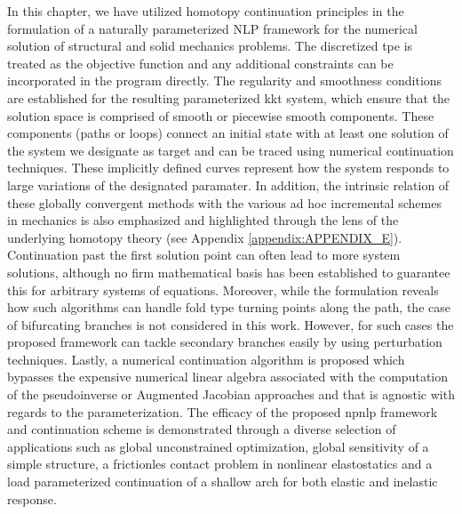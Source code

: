 In this chapter, we have utilized homotopy continuation principles in the
formulation of a naturally parameterized NLP framework for
the numerical solution of structural and solid mechanics problems. The
discretized \acrshort{tpe} is treated as the objective function and any 
additional
constraints can be incorporated in the program directly. The regularity and
smoothness conditions are established for the resulting parameterized 
\acrshort{kkt}
system, which ensure that the
solution space is comprised of smooth or piecewise smooth components. These
components (paths or loops) connect an initial state with at least one solution 
of the system we designate as target and can be traced using numerical
continuation techniques. These implicitly defined curves
represent how the system responds to large variations of the designated
paramater. In addition, the intrinsic relation of these globally convergent 
methods with the various ad
hoc incremental schemes in mechanics is also emphasized and highlighted 
through the lens of the
underlying homotopy theory (see Appendix \ref{appendix:APPENDIX_E}). Continuation past 
the first 
solution point can 
often lead 
to more system solutions, although no firm mathematical basis has been
established to guarantee this for arbitrary systems of equations. Moreover, 
while the formulation reveals how such algorithms 
can handle fold type turning points along the path, the case of 
bifurcating branches is not considered in this work. However, for such cases the
proposed framework can tackle secondary branches easily by using perturbation
techniques. Lastly, a numerical continuation algorithm is proposed which
bypasses the expensive numerical linear algebra associated with the computation 
of the
pseudoinverse or Augmented Jacobian approaches and that is agnostic with regards
to the parameterization.
The efficacy of the proposed \acrshort{npnlp} framework and continuation scheme 
is
demonstrated through a diverse selection of 
applications such as global unconstrained optimization, global 
sensitivity of a simple structure, a frictionles contact problem in nonlinear
elastostatics and a load parameterized continuation of a shallow arch for both 
elastic and inelastic response.